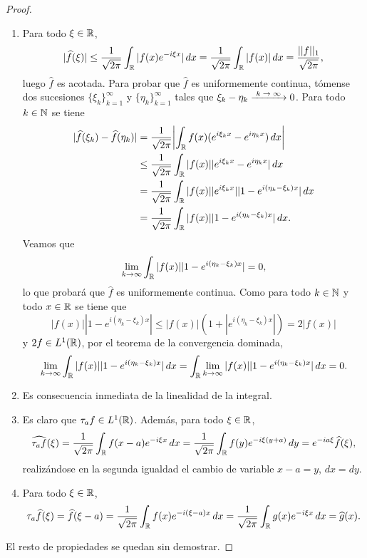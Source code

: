 \documentclass[a4paper, 12pt, extrafontsizes]{memoir}
\begin{document}
\begin{proof}
    \hfill
    \begin{enumerate}
        \item Para todo $\xi \in \mathbb R$,
        \[|\widehat{f}(\xi)| \leq \frac{1}{\sqrt{2\pi}} \int_\mathbb R |f(x)e^{-i\xi x}| \, dx = \frac{1}{\sqrt{2\pi}}\int_\mathbb R |f(x)| \, dx = \frac{||f||_1}{\sqrt{2\pi}},\]
        luego $\widehat{f}$ es acotada. Para probar que $\widehat{f}$ es uniformemente continua, tómense dos sucesiones $\{\xi_k\}_{k=1}^\infty$ y $\{\eta_k\}_{k=1}^\infty$ tales que $\xi_k-\eta_k \kconv 0$. Para todo $k \in \mathbb N$ se tiene
        \begin{align*}
            |\widehat{f}(\xi_k) - \widehat{f}(\eta_k)| &=\frac{1}{\sqrt{2\pi}} \biggl|\int_\mathbb R f(x)(e^{i\xi_k x}-e^{i\eta_k x}) \, dx\biggr| \\
            &\leq \frac{1}{\sqrt{2\pi}} \int_\mathbb R |f(x)||e^{i\xi_k x} - e^{i\eta_kx}| \, dx \\
            &= \frac{1}{\sqrt{2\pi}} \int_\mathbb R |f(x)||e^{i\xi_kx}||1 - e^{i(\eta_k-\xi_k)x}| \, dx \\
            &= \frac{1}{\sqrt{2\pi}} \int_\mathbb R |f(x)||1 - e^{i(\eta_k-\xi_k)x}| \, dx.
        \end{align*}
        Veamos que
        \[\lim_{k \to \infty} \int_\mathbb R |f(x)||1 - e^{i(\eta_k-\xi_k)x}| = 0, \]
        lo que probará que $\widehat{f}$ es uniformemente continua. Como para todo $k \in \mathbb N$ y todo $x \in \mathbb R$ se tiene que
        \[|f(x)||1-e^{i(\eta_k-\xi_k)x}| \leq |f(x)|(1+|e^{i(\eta_k-\xi_k)x}|) = 2|f(x)|\]
        y $2f \in L^1(\mathbb R)$, por el teorema de la convergencia dominada,
        \[\lim_{k \to \infty} \int_\mathbb R |f(x)||1 - e^{i(\eta_k-\xi_k)x}|\, dx =\int_\mathbb R \lim_{k \to \infty} |f(x)||1 - e^{i(\eta_k-\xi_k)x}| \, dx = 0. \]
        \item Es consecuencia inmediata de la linealidad de la integral.
        \item Es claro que $\tau_af \in L^1(\mathbb R)$. Además, para todo $\xi \in \mathbb R$,
        \[\widehat{\tau_af}(\xi) = \frac{1}{\sqrt{2\pi}} \int_\mathbb R f(x-a)e^{-i\xi x} \, dx = \frac{1}{\sqrt{2\pi}}\int_\mathbb R f(y)e^{-i\xi(y+a)} \, dy = e^{-ia \xi}\widehat{f}(\xi),\]
        realizándose en la segunda igualdad el cambio de variable $x-a = y$, $dx = dy$.
        \item Para todo $\xi \in \mathbb R$,
        \[\tau_a\widehat{f}(\xi) = \widehat{f}(\xi-a) = \frac{1}{\sqrt{2\pi}}\int_\mathbb R f(x)e^{-i(\xi-a)x} \, dx = \frac{1}{\sqrt{2\pi}}\int_\mathbb R g(x)e^{-i\xi x} \, dx = \widehat{g}(x).\]
    \end{enumerate}
    El resto de propiedades se quedan sin demostrar.
\end{proof}
\end{document}
